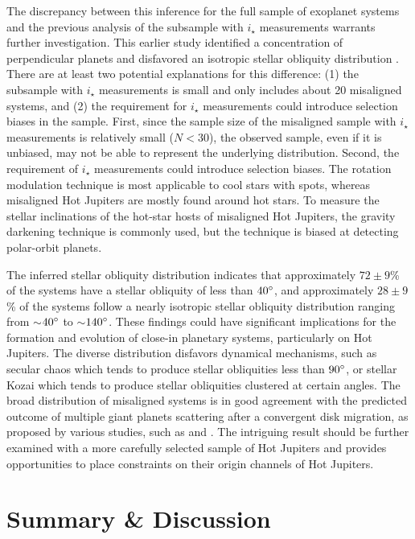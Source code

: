 \documentclass[twocolumn,times]{aastex631}
\begin{document}
The discrepancy between this inference for the full sample of exoplanet systems and the previous analysis of the subsample with $i_\star$ measurements \citep{Albrecht21} warrants further investigation.
This earlier study identified a concentration of perpendicular planets and disfavored an isotropic stellar obliquity distribution \citep{Albrecht21}.
There are at least two potential explanations for this difference: (1) the subsample with $i_\star$ measurements is small and only includes about 20 misaligned systems, and (2) the requirement for $i_\star$ measurements could introduce selection biases in the sample. 
First, since the sample size of the misaligned sample with $i_\star$ measurements is relatively small ($N < 30$), the observed sample, even if it is unbiased, may not be able to represent the underlying distribution.
Second, the requirement of $i_\star$ measurements could introduce selection biases. The rotation modulation technique is most applicable to cool stars with spots, whereas misaligned Hot Jupiters are mostly found around hot stars. To measure the stellar inclinations of the hot-star hosts of misaligned Hot Jupiters, the gravity darkening technique is commonly used, but the technique is biased at detecting polar-orbit planets.

The inferred stellar obliquity distribution indicates that approximately $72\pm9$\% of the systems have a stellar obliquity of less than $40\mbox{$^\circ$}$, and approximately $28\pm9$\% of the systems follow a nearly isotropic stellar obliquity distribution ranging from $\sim$$40\mbox{$^\circ$}$ to $\sim$$140\mbox{$^\circ$}$. These findings could have significant implications for the formation and evolution of close-in planetary systems, particularly on Hot Jupiters. The diverse distribution disfavors dynamical mechanisms, such as secular chaos which tends to produce stellar obliquities less than $90\mbox{$^\circ$}$, or stellar Kozai which tends to produce stellar obliquities clustered at certain angles.
The broad distribution of misaligned systems is in good agreement with the predicted outcome of multiple giant planets scattering after a convergent disk migration, as proposed by various studies, such as \cite{Nagasawa11} and \cite{Beague12}. The intriguing result should be further examined with a more carefully selected sample of Hot Jupiters and provides opportunities to place constraints on their origin channels of Hot Jupiters.

\section{Summary \& Discussion}
\end{document}
